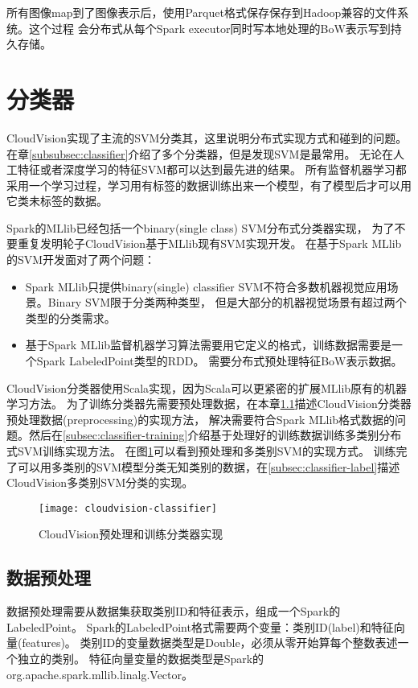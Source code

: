 所有图像map到了图像表示后，使用Parquet格式保存保存到Hadoop兼容的文件系统。这个过程
会分布式从每个Spark executor同时写本地处理的BoW表示写到持久存储。


\section{分类器}
\label{sec:cloudvision_classifier}
CloudVision实现了主流的SVM分类其，这里说明分布式实现方式和碰到的问题。
在章\ref{subsubsec:classifier}介绍了多个分类器，但是发现SVM是最常用。
无论在人工特征或者深度学习的特征SVM都可以达到最先进的结果。
所有监督机器学习都采用一个学习过程，学习用有标签的数据训练出来一个模型，有了模型后才可以用
它类未标签的数据。


Spark的MLlib已经包括一个binary(single class) SVM分布式分类器实现，
为了不要重复发明轮子CloudVision基于MLlib现有SVM实现开发。
在基于Spark MLlib的SVM开发面对了两个问题：
\begin{itemize}
  \item Spark MLlib只提供binary(single) classifier SVM不符合多数机器视觉应用场景。Binary SVM限于分类两种类型，
        但是大部分的机器视觉场景有超过两个类型的分类需求。
  \item 基于Spark MLlib监督机器学习算法需要用它定义的格式，训练数据需要是一个Spark LabeledPoint类型的RDD。
        需要分布式预处理特征BoW表示数据。
\end{itemize}

CloudVision分类器使用Scala实现，因为Scala可以更紧密的扩展MLlib原有的机器学习方法。
为了训练分类器先需要预处理数据，在本章\ref{subsec:classifier-preprocessing}描述CloudVision分类器预处理数据(preprocessing)的实现方法，
解决需要符合Spark MLlib格式数据的问题。然后在\ref{subsec:classifier-training}介绍基于处理好的训练数据训练多类别分布式SVM训练实现方法。
在图\ref{fig:cloudvision-classifier}可以看到预处理和多类别SVM的实现方式。
训练完了可以用多类别的SVM模型分类无知类别的数据，在\ref{subsec:classifier-label}描述CloudVision多类别SVM分类的实现。

\begin{figure}[h]
  \centering
    \texttt{[image: cloudvision-classifier]}
  \caption{CloudVision预处理和训练分类器实现}
  \label{fig:cloudvision-classifier}
\end{figure}



\subsection{数据预处理}
\label{subsec:classifier-preprocessing}
数据预处理需要从数据集获取类别ID和特征表示，组成一个Spark的LabeledPoint。
Spark的LabeledPoint格式需要两个变量：类别ID(label)和特征向量(features)。
类别ID的变量数据类型是Double，必须从零开始算每个整数表述一个独立的类别。
特征向量变量的数据类型是Spark的org.apache.spark.mllib.linalg.Vector。

